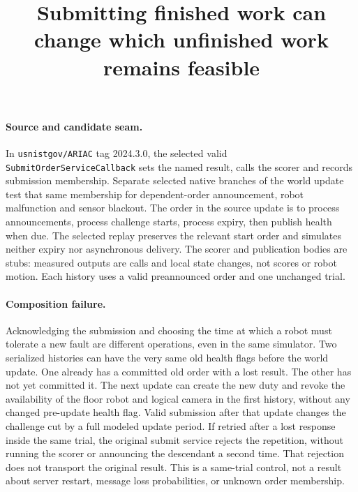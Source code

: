 \documentclass{article}
\begin{document}
\title{Submitting finished work can change which unfinished work remains feasible}
\maketitle

\paragraph{Source and candidate seam.}
In \texttt{usnistgov/ARIAC} tag 2024.3.0, the selected valid
\texttt{SubmitOrderServiceCallback} sets the named result, calls the
scorer and records submission membership. Separate selected native
branches of the world update test that same membership for
dependent-order announcement, robot malfunction and sensor blackout.
The order in the source update is to process announcements, process
challenge starts, process expiry, then publish health when due.
The selected replay preserves the relevant start order and simulates
neither expiry nor asynchronous delivery. The scorer and publication
bodies are stubs: measured outputs are calls and local state changes,
not scores or robot motion. Each history uses a valid preannounced
order and one unchanged trial.

\paragraph{Composition failure.}
Acknowledging the submission and choosing the time at which a
robot must tolerate a new fault are different operations, even in
the same simulator. Two serialized histories can have the very same
old health flags before the world update. One already has a
committed old order with a lost result. The other has not yet
committed it. The next update can create the new duty and revoke the
availability of the floor robot and logical camera in the first
history, without any changed pre-update health flag. Valid submission
after that update changes the challenge cut by a full modeled update
period. If retried after a lost response inside the same trial, the
original submit service rejects the repetition, without running the
scorer or announcing the descendant a second time. That rejection
does not transport the original result. This is a same-trial control,
not a result about server restart, message loss probabilities, or
unknown order membership.
\end{document}
